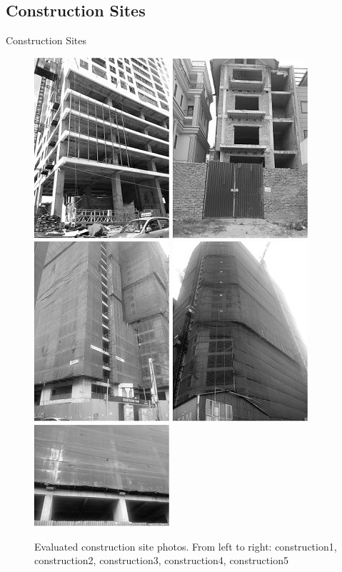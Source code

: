 \documentclass{beamer}
\begin{document}
\subsection{Construction Sites}
\begin{frame}{Construction Sites}
\begin{figure}[h]
	\centering
	\includegraphics[width=0.18\columnwidth]{images/construction1.jpg}
	\includegraphics[width=0.18\columnwidth]{images/construction2.jpg}
	\includegraphics[width=0.18\columnwidth]{images/construction3.jpg}
	\includegraphics[width=0.18\columnwidth]{images/construction4.jpg}
	\includegraphics[width=0.18\columnwidth]{images/construction5.jpg}
	\caption{Evaluated construction site photos. From left to right: construction1, construction2, construction3, construction4, construction5}
	\label{fig:construction}
\end{figure}
\end{frame}
\end{document}
